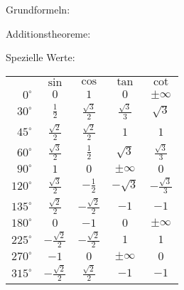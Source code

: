 \begin{minipage}[t]{0.45\textwidth}
Grundformeln:\medskip
{}

Additionstheoreme:\medskip
{}


Spezielle Werte:\medskip\par
\begingroup
\renewcommand{\arraystretch}{1.4}
\setlength{\tabcolsep}{0.8em}
\begin{tabular}{rcccc}
                & $\sin$                & $\cos$                & $\tan$               & $\cot$                \\
    $0^{\circ}$ & $0$                   & $1$                   & $0$                  & $\pm\infty$           \\
   $30^{\circ}$ & $\frac{1}{2}$         & $\frac{\sqrt{3}}{2}$  & $\frac{\sqrt{3}}{3}$ & $\sqrt{3}$            \\
   $45^{\circ}$ & $\frac{\sqrt{2}}{2}$  & $\frac{\sqrt{2}}{2}$  & $1$                  & $1$                   \\
   $60^{\circ}$ & $\frac{\sqrt{3}}{2}$  & $\frac{1}{2}$         & $\sqrt{3}$           & $\frac{\sqrt{3}}{3}$  \\
   $90^{\circ}$ & $1$                   & $0$                   & $\pm\infty$          & $0$                   \\
  $120^{\circ}$ & $\frac{\sqrt{3}}{2}$  & $-\frac{1}{2}$        & $-\sqrt{3}$          & $-\frac{\sqrt{3}}{3}$ \\
  $135^{\circ}$ & $\frac{\sqrt{2}}{2}$  & $-\frac{\sqrt{2}}{2}$ & $-1$                 & $-1$                  \\
  $180^{\circ}$ & $0$                   & $-1$                  & $0$                  & $\pm\infty$           \\
  $225^{\circ}$ & $-\frac{\sqrt{2}}{2}$ & $-\frac{\sqrt{2}}{2}$ & $1$                  & $1$                   \\
  $270^{\circ}$ & $-1$                  & $0$                   & $\pm\infty$          & $0$                   \\
  $315^{\circ}$ & $-\frac{\sqrt{2}}{2}$ & $\frac{\sqrt{2}}{2}$  & $-1$                 & $-1$                  \\
\end{tabular}
\endgroup
\end{minipage}

